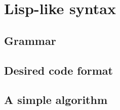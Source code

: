 \chapter{Lisp-like syntax}
\section{Grammar}
\section{Desired code format}
\section{A simple algorithm}

